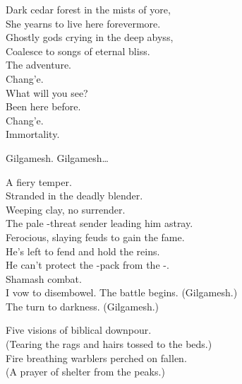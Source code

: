 Dark cedar forest in the mists of yore, \\
She yearns to live here forevermore. \\
Ghostly gods crying in the deep abyss, \\
Coalesce to songs of eternal bliss. \\

The adventure. \\
Chang'e. \\
What will you see? \\
Been here before. \\
Chang'e. \\
Immortality. \\




Gilgamesh. Gilgamesh… \\


A fiery temper. \\
Stranded in the deadly blender. \\
Weeping  clay, no surrender. \\
The pale -threat sender leading him astray. \\
Ferocious, slaying feuds to gain the fame. \\
He's left to fend and hold the reins. \\
He can't protect the -pack from the -. \\
Shamash combat. \\

I vow to disembowel. The battle begins. (Gilgamesh.) \\
The  turn to darkness. (Gilgamesh.) \\


Five visions of biblical downpour. \\
(Tearing the rags and hairs tossed to the  beds.) \\
Fire breathing warblers perched on fallen. \\
(A prayer of shelter from the peaks.) \\


